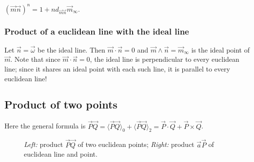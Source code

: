 \documentclass[12pt]{article}
\newcommand{\mydogblue}{{\color{gray} $\square$~~}}
\begin{document}
\myexercise  $(\vec{m}\vec{n})^{n} = 1 + {n d_{\vec{m}\vec{n}} \vec{m}_{\infty}}$. %

\subsubsection{Product of a euclidean line with the ideal line} Let $\vec{n} =\vec{\omega}$ be the ideal line. Then $\vec{m} \cdot \vec{n} = 0$ and $\vec{m} \wedge \vec{n} = \vec{m}_{\infty}$ is the ideal point of $\vec{m}$.  Note that since $\vec{m} \cdot \vec{n} = 0$, the ideal line is perpendicular to every euclidean line; since it shares an ideal point with each such line, it is  parallel to every euclidean line!

\subsection{Product of two points}
\label{sec:pr2pts}
Here the general formula is $\vec{P} \vec{Q} =  \langle \vec{P}\vec{Q}\rangle_{0} +\langle \vec{P}\vec{Q}\rangle_{2} = \vec{P} \cdot \vec{Q} + \vec{P} \times \vec{Q}$.  

   \begin{figure}
   \centering
{\setlength\fboxsep{0pt}} \hspace{.02\textwidth}
{\setlength\fboxsep{0pt}}\caption{\textit{Left:}  product $\vec{P}\vec{Q}$ of two euclidean points; \textit{Right:}  product $\vec{a}\vec{P}$ of euclidean line and point.}
\label{fig:twoPoints}
\end{figure}
\end{document}
